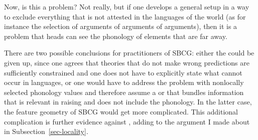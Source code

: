 \documentclass[output=paper
	        ,collection
	        ,collectionchapter
 	        ,biblatex
                ,babelshorthands
                ,newtxmath
                ,draftmode
                ,colorlinks, citecolor=brown
]{langscibook}
\begin{document}
Now, is this a problem? Not really, but if one develops a general setup in a
way to exclude everything that is not attested in the languages of the world (as for instance the
selection of arguments of arguments of arguments), then it is a problem that heads can see the
phonology of elements that are far away.

There are two possible conclusions for practitioners of SBCG: either the \motherf could be given up,
since one agrees that theories that do not make wrong predictions are sufficiently constrained and
one does not have to explicitly state what cannot occur in languages, or one would have to address
the problem with nonlocally selected phonology values and therefore assume a \synsem or \localf that
bundles information that is relevant in raising and does not include the
phonology.
In the latter case, the feature geometry of SBCG would get more complicated. This additional
complication is further evidence against \mother, adding to the argument I made about \mother in Subsection~\ref{sec-locality}.

\label{sec-local-feature-sbcg}
\end{document}
